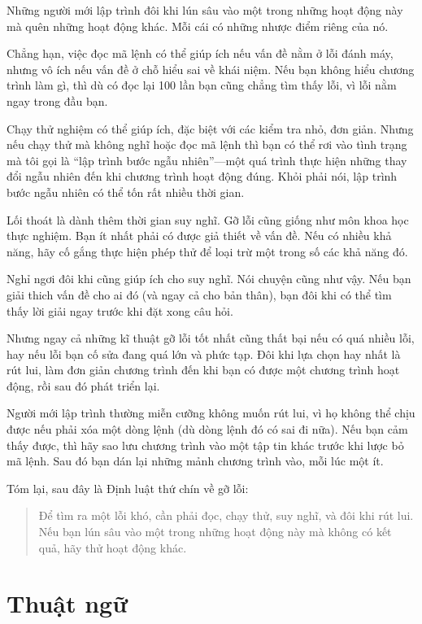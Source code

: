\documentclass[12pt]{book}
\begin{document}
Những người mới lập trình đôi khi lún sâu vào một trong những hoạt
động này mà quên những hoạt động khác. Mỗi cái có những 
nhược điểm riêng của nó.

Chẳng hạn, việc đọc mã lệnh có thể giúp ích nếu vấn đề nằm ở lỗi
đánh máy, nhưng vô ích nếu vấn đề ở chỗ hiểu sai về khái niệm. Nếu
bạn không hiểu chương trình làm gì, thì dù có đọc lại 100 lần bạn
cũng chẳng tìm thấy lỗi, vì lỗi nằm ngay trong đầu bạn.

Chạy thử nghiệm có thể giúp ích, đặc biệt với các kiểm tra nhỏ,
đơn giản. Nhưng nếu chạy thử mà không nghĩ hoặc đọc mã lệnh thì bạn
có thể rơi vào tình trạng mà tôi gọi là ``lập trình bước ngẫu
nhiên''---một quá trình thực hiện những thay đổi ngẫu nhiên đến
khi chương trình hoạt động đúng. Khỏi phải nói, lập trình bước
ngẫu nhiên có thể tốn rất nhiều thời gian.

Lối thoát là dành thêm thời gian suy nghĩ. Gỡ lỗi cũng giống như
môn khoa học thực nghiệm. Bạn ít nhất phải có được giả thiết về
vấn đề. Nếu có nhiều khả năng, hãy cố gắng thực hiện phép thử
để loại trừ một trong số các khả năng đó.

Nghỉ ngơi đôi khi cũng giúp ích cho suy nghĩ. Nói chuyện cũng như
vậy. Nếu bạn giải thich vấn đề cho ai đó (và ngay cả cho bản thân),
bạn đôi khi có thể tìm thấy lời giải ngay trước khi đặt xong câu
hỏi.

Nhưng ngay cả những kĩ thuật gỡ lỗi tốt nhất cũng thất bại nếu có
quá nhiều lỗi, hay nếu lỗi bạn cố sửa đang quá lớn và phức tạp. 
Đôi khi lựa chọn hay nhất là rút lui, làm đơn giản chương trình
đến khi bạn có được một chương trình hoạt động, rồi sau đó phát triển
lại.

Người mới lập trình thường miễn cưỡng không muốn rút lui,
vì họ không thể chịu được nếu phải xóa một dòng lệnh (dù dòng lệnh
đó có sai đi nữa). Nếu bạn cảm thấy được, thì hãy sao lưu chương trình
vào một tập tin khác trước khi lược bỏ mã lệnh. Sau đó bạn dán 
lại những mảnh chương trình vào, mỗi lúc một ít.

Tóm lại, sau đây là Định luật thứ chín về gỡ lỗi:

\begin{quote}
Để tìm ra một lỗi khó, cần phải đọc, chạy thử, suy nghĩ, và đôi khi
rút lui. Nếu bạn lún sâu vào một trong những hoạt động này mà không
có kết quả, hãy thử hoạt động khác.
\end{quote}



\section{Thuật ngữ}
\end{document}
